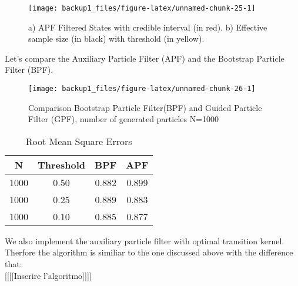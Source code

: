\documentclass[
]{book}
\theoremstyle{break}
\theoremstyle{nonumberplain}
\begin{document}
\begin{figure}[H]

{\centering \texttt{[image: backup1\_files/figure-latex/unnamed-chunk-25-1]} 

}

\caption{a) APF Filtered States with credible interval (in red). b) Effective sample size (in black) with threshold (in yellow).}\label{fig:unnamed-chunk-25}
\end{figure}

Let's compare the Auxiliary Particle Filter (APF) and the Bootstrap
Particle Filter (BPF).

\begin{figure}[H]

{\centering \texttt{[image: backup1\_files/figure-latex/unnamed-chunk-26-1]} 

}

\caption{Comparison Bootstrap Particle Filter(BPF) and Guided Particle Filter (GPF), number of generated particles N=1000}\label{fig:unnamed-chunk-26}
\end{figure}

\begin{longtable}[t]{cccc}
\caption{\label{tab:unnamed-chunk-28}Root Mean Square Errors}\\
\toprule
N & Threshold & BPF & APF\\
\midrule
1000 & 0.50 & 0.882 & 0.899\\
1000 & 0.25 & 0.889 & 0.883\\
1000 & 0.10 & 0.885 & 0.877\\
\bottomrule
\end{longtable}

We also implement the auxiliary particle filter with optimal transition
kernel. Therfore the algorithm is similiar to the one discussed above
with the difference that:\\
{[}{[}{[}{[}Inserire l'algoritmo{]}{]}{]}{]}
\end{document}
